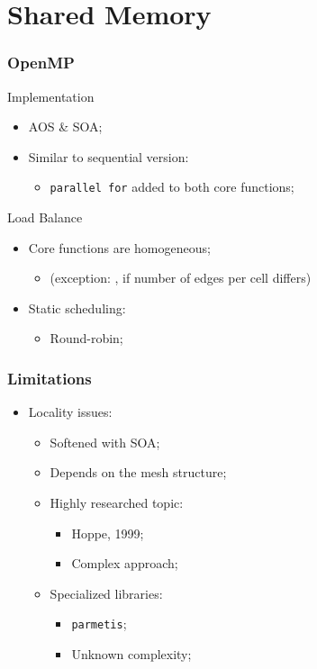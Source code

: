 \section{Shared Memory}


\begin{frame}
	\frametitle{OpenMP}
	\begin{block}{Implementation}
		\begin{itemize}
			\item AOS \& SOA;
			\item Similar to sequential version:
			\begin{itemize}
				\item \texttt{parallel for} added to both core functions;
			\end{itemize}
		\end{itemize}
	\end{block}

	\begin{block}{Load Balance}
		\begin{itemize}
			\item Core functions are homogeneous;
			\begin{itemize}
				\item [] (exception: \update, if number of edges per cell differs)
			\end{itemize}
			\item Static scheduling:
			\begin{itemize}
				\item Round-robin;
			\end{itemize}
		\end{itemize}
	\end{block}
\end{frame}

\begin{frame}
	\frametitle{Limitations}
	\begin{itemize}
		\item Locality issues:
		\begin{itemize}
			\item Softened with SOA;
			\item Depends on the mesh structure;
			\item Highly researched topic:
			\begin{itemize}
				\item Hoppe, 1999;
				\item Complex approach;
			\end{itemize}
			\item Specialized libraries:
			\begin{itemize}
				\item \texttt{parmetis};
				\item Unknown complexity;
			\end{itemize}
		\end{itemize}
	\end{itemize}
\end{frame}